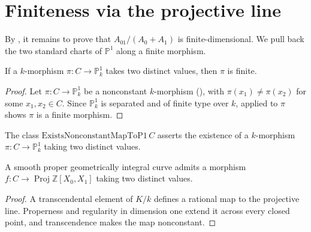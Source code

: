 \section{Finiteness via the projective line}
\label{sec:RiemannRoch_Adelic_finiteness}

By , it remains to prove
that \(A_{01}/(A_0+A_1)\) is finite-dimensional.  We pull back the two
standard charts of \(\mathbb P^1\) along a finite morphism.

\begin{proposition}
  \label{thm:adelic_exists_finiteMorphismToP1}
  \leanok
  If a \(k\)-morphism \(\pi\colon C\to\mathbb P^1_k\) takes two distinct
  values, then \(\pi\) is finite.
\end{proposition}
\begin{proof}
  \leanok
  Let \(\pi \colon C \to \mathbb{P}^1_k\) be a nonconstant \(k\)-morphism
  (), with \(\pi(x_1) \ne
  \pi(x_2)\) for some \(x_1, x_2 \in C\). Since \(\mathbb{P}^1_k\) is
  separated and of finite type over \(k\), 
  applied to \(\pi\) shows \(\pi\) is a finite morphism.
\end{proof}

\begin{definition}
  \label{def:adelic_nonconstant_map_gate}
  \leanok
  The class \(\mathrm{ExistsNonconstantMapToP1}\, C\) asserts the
  existence of a \(k\)-morphism \(\pi \colon C \to \mathbb{P}^1_k\)
  taking two distinct values.
\end{definition}

\begin{proposition}
  \label{thm:adelic_exists_nonconstant_projint}
  \leanok
  A smooth proper geometrically integral curve admits a morphism
  \(f\colon C\to\operatorname{Proj}\mathbb Z[X_0,X_1]\) taking two
  distinct values.
\end{proposition}
\begin{proof}
  \leanok
  A transcendental element of \(K/k\) defines a rational map to the
  projective line.  Properness and regularity in dimension one extend it
  across every closed point, and transcendence makes the map nonconstant.
\end{proof}

